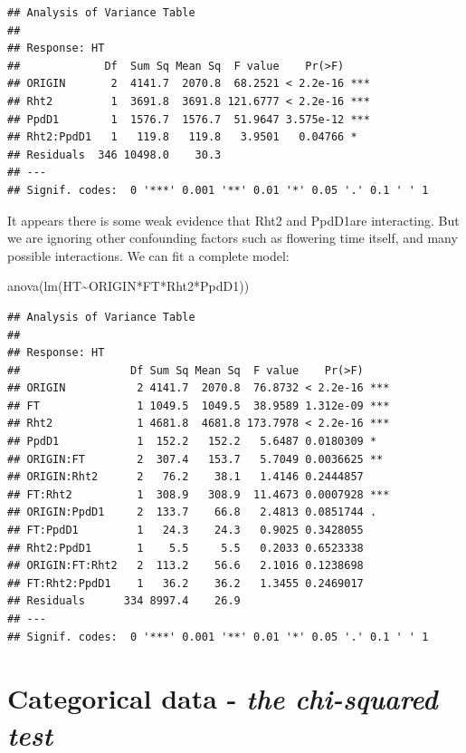 \documentclass[
]{book}
\newenvironment{Shaded}{\begin{snugshade}}{\end{snugshade}}
\newcommand{\FunctionTok}[1]{\textcolor[rgb]{0.00,0.00,0.00}{#1}}
\newcommand{\NormalTok}[1]{#1}
\newcommand{\SpecialCharTok}[1]{\textcolor[rgb]{0.00,0.00,0.00}{#1}}
\begin{document}
\begin{verbatim}
## Analysis of Variance Table
## 
## Response: HT
##             Df  Sum Sq Mean Sq  F value    Pr(>F)    
## ORIGIN       2  4141.7  2070.8  68.2521 < 2.2e-16 ***
## Rht2         1  3691.8  3691.8 121.6777 < 2.2e-16 ***
## PpdD1        1  1576.7  1576.7  51.9647 3.575e-12 ***
## Rht2:PpdD1   1   119.8   119.8   3.9501   0.04766 *  
## Residuals  346 10498.0    30.3                       
## ---
## Signif. codes:  0 '***' 0.001 '**' 0.01 '*' 0.05 '.' 0.1 ' ' 1
\end{verbatim}

It appears there is some weak evidence that Rht2 and PpdD1are interacting. But we are ignoring other confounding factors such as flowering time itself, and many possible interactions. We can fit a complete model:

\begin{Shaded}
\begin{Highlighting}[]
\FunctionTok{anova}\NormalTok{(}\FunctionTok{lm}\NormalTok{(HT}\SpecialCharTok{\textasciitilde{}}\NormalTok{ORIGIN}\SpecialCharTok{*}\NormalTok{FT}\SpecialCharTok{*}\NormalTok{Rht2}\SpecialCharTok{*}\NormalTok{PpdD1))}
\end{Highlighting}
\end{Shaded}

\begin{verbatim}
## Analysis of Variance Table
## 
## Response: HT
##                 Df Sum Sq Mean Sq  F value    Pr(>F)    
## ORIGIN           2 4141.7  2070.8  76.8732 < 2.2e-16 ***
## FT               1 1049.5  1049.5  38.9589 1.312e-09 ***
## Rht2             1 4681.8  4681.8 173.7978 < 2.2e-16 ***
## PpdD1            1  152.2   152.2   5.6487 0.0180309 *  
## ORIGIN:FT        2  307.4   153.7   5.7049 0.0036625 ** 
## ORIGIN:Rht2      2   76.2    38.1   1.4146 0.2444857    
## FT:Rht2          1  308.9   308.9  11.4673 0.0007928 ***
## ORIGIN:PpdD1     2  133.7    66.8   2.4813 0.0851744 .  
## FT:PpdD1         1   24.3    24.3   0.9025 0.3428055    
## Rht2:PpdD1       1    5.5     5.5   0.2033 0.6523338    
## ORIGIN:FT:Rht2   2  113.2    56.6   2.1016 0.1238698    
## FT:Rht2:PpdD1    1   36.2    36.2   1.3455 0.2469017    
## Residuals      334 8997.4    26.9                       
## ---
## Signif. codes:  0 '***' 0.001 '**' 0.01 '*' 0.05 '.' 0.1 ' ' 1
\end{verbatim}

\hypertarget{categorical-data---the-chi-squared-test}{%
\section{\texorpdfstring{Categorical data - \emph{the chi-squared test}}{Categorical data - the chi-squared test}}\label{categorical-data---the-chi-squared-test}}
\end{document}
